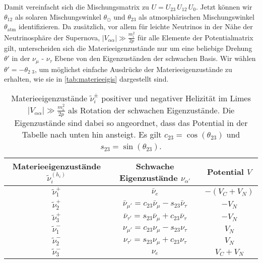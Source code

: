 Damit vereinfacht sich die Mischungsmatrix zu $U = U_{2 3} \, U_{1 2} \, U_0$.
Jetzt können wir $\theta_{1 2}$ als solaren Mischungswinkel $\theta_\odot$ und $\theta_{2 3}$ als atmosphärischen Mischungswinkel $\theta_\text{atm}$ identifizieren.
Da zusätzlich, vor allem für leichte Neutrinos in der Nähe der Neutrinosphäre der Supernova, $|V_{\alpha \alpha}| \gg \frac{m^2_i}{2 p}$ für alle Elemente der Potentialmatrix gilt, unterscheiden sich die Materieeigenzustände nur um eine
beliebige Drehung $\theta'$ in der $\nu_\mu$ - $\nu_\tau$ Ebene von den Eigenzuständen der schwachen Basis.
Wir wählen $\theta' = -\theta_\text{2 3}$, um möglichst einfache Ausdrücke der Materieeigenzustände zu erhalten, wie sie in \autoref{tab:materieeigis} dargestellt sind.
\begin{table}[H]
    \centering
    \begin{tabular}{S S S}
      \toprule
    {Materieeigenzustände $\tilde{\nu}^{(h_i)}_i$} & {Schwache Eigenzustände $\nu_{\alpha'}$} & {Potential $V$} \\
      \midrule
       {$\tilde{\nu}^+_1$} & {$\bar{\nu}_e$}                                                        &  {$- (V_C + V_N)$} \\
       {$\tilde{\nu}^+_2$} & {$\bar{\nu}_{\mu'}  = c_{2 3} \bar{\nu}_\mu - s_{2 3} \bar{\nu}_\tau$} &  {$- V_N$} \\
       {$\tilde{\nu}^+_3$} & {$\bar{\nu}_{\tau'} = s_{2 3} \bar{\nu}_\mu + c_{2 3} \bar{\nu}_\tau$} &  {$- V_N$} \\
       {$\tilde{\nu}^-_1$} & {$\nu_{\mu'}        = c_{2 3} \nu_\mu       - s_{2 3} \nu_\tau$}       &  {$V_N$} \\
       {$\tilde{\nu}^-_2$} & {$\nu_{\tau'}       = s_{2 3} \nu_\mu       + c_{2 3} \nu_\tau$}       &  {$V_N$} \\
       {$\tilde{\nu}^-_3$} & {$\nu_e$}                                                              &  {$V_C + V_N$} \\
    \bottomrule
    \end{tabular}
    \caption{Materieeigenzustände $\tilde{\nu}^\pm_i$ positiver und negativer Helizität im Limes $|V_{\alpha \alpha}| \gg \frac{m^2_i}{2 p}$ als Rotation der schwachen Eigenzustände. Die Eigenzustände sind dabei so
            angeordnet, dass das Potential in der Tabelle nach unten hin ansteigt. Es gilt $c_{2 3} = \cos(\theta_{2 3})$ und $s_{2 3} = \sin(\theta_{2 3})$.}
    \label{tab:materieeigis}
\end{table}

